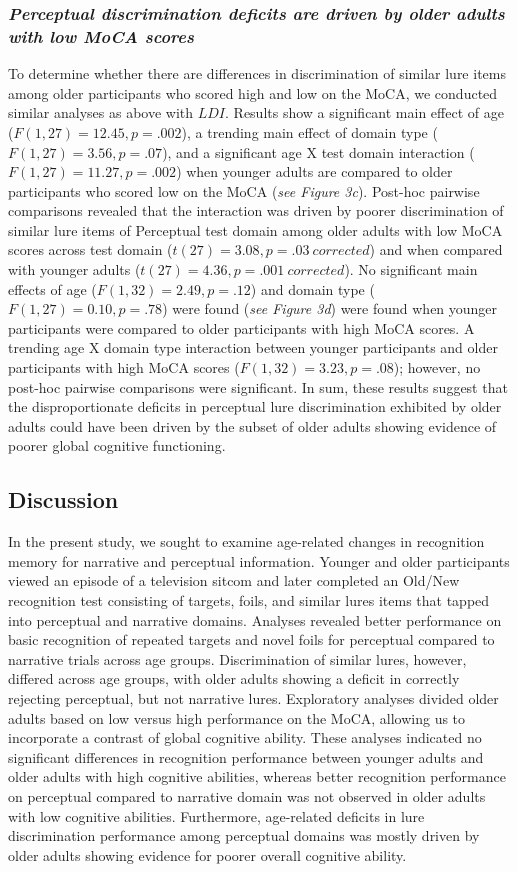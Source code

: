 \documentclass[11pt]{article}
\begin{document}
\subsubsection*{\textit{Perceptual discrimination deficits are driven by older adults with low MoCA scores}}
To determine whether there are differences in discrimination of similar lure items among older participants who scored high and low on the MoCA, we conducted similar analyses as above with $LDI$. Results show a significant main effect of age ($F(1, 27) = 12.45, p = .002$), a trending main effect of domain type ($F(1, 27) = 3.56, p = .07$), and a significant age X test domain interaction ($F(1, 27) = 11.27, p = .002$) when younger adults are compared to older participants who scored low on the MoCA (\textit{see Figure 3c}). Post-hoc pairwise comparisons revealed that the interaction was driven by poorer discrimination of similar lure items of Perceptual test domain among older adults with low MoCA scores across test domain ($t(27) = 3.08, p = .03 \ corrected$) and when compared with younger adults ($t(27) = 4.36, p = .001 \ corrected$). No significant main effects of age ($F(1, 32) = 2.49, p = .12$) and domain type ($F(1, 27) = 0.10, p = .78$) were found (\textit{see Figure 3d}) were found when younger participants were compared to older participants with high MoCA scores. A trending age X domain type interaction between younger participants and older participants with high MoCA scores ($F(1, 32) = 3.23, p = .08$); however, no post-hoc pairwise comparisons were significant. In sum, these results suggest that the disproportionate deficits in perceptual lure discrimination exhibited by older adults could have been driven by the subset of older adults showing evidence of poorer global cognitive functioning.

\subsection*{Discussion}
In the present study, we sought to examine age-related changes in recognition memory for narrative and perceptual information. Younger and older participants viewed an episode of a television sitcom and later completed an Old/New recognition test consisting of targets, foils, and similar lures items that tapped into perceptual and narrative domains. Analyses revealed better performance on basic recognition of repeated targets and novel foils for perceptual compared to narrative trials across age groups. Discrimination of similar lures, however, differed across age groups, with older adults showing a deficit in correctly rejecting perceptual, but not narrative lures. Exploratory analyses divided older adults based on low versus high performance on the MoCA, allowing us to incorporate a contrast of global cognitive ability. These analyses indicated no significant differences in recognition performance between younger adults and older adults with high cognitive abilities, whereas better recognition performance on perceptual compared to narrative domain was not observed in older adults with low cognitive abilities. Furthermore, age-related deficits in lure discrimination performance among perceptual domains was mostly driven by older adults showing evidence for poorer overall cognitive ability.
\end{document}
